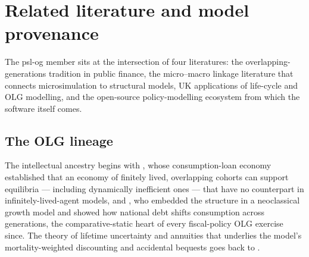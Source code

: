 \section{Related literature and model provenance}
\label{sec:literature}

The psl-og member sits at the intersection of four literatures: the overlapping-generations tradition in public finance, the micro--macro linkage literature that connects microsimulation to structural models, UK applications of life-cycle and OLG modelling, and the open-source policy-modelling ecosystem from which the software itself comes.

\subsection{The OLG lineage}
\label{subsec:olglineage}

The intellectual ancestry begins with \citet{Samuelson1958}, whose consumption-loan economy established that an economy of finitely lived, overlapping cohorts can support equilibria --- including dynamically inefficient ones --- that have no counterpart in infinitely-lived-agent models, and \citet{Diamond1965}, who embedded the structure in a neoclassical growth model and showed how national debt shifts consumption across generations, the comparative-static heart of every fiscal-policy OLG exercise since. The theory of lifetime uncertainty and annuities that underlies the model's mortality-weighted discounting and accidental bequests goes back to \citet{Yaari1965}.

